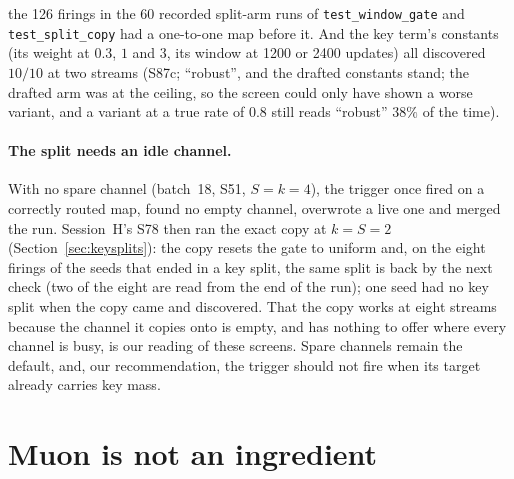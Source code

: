 \documentclass[11pt]{article}
\begin{document}
the 126 firings in the 60 recorded split-arm runs of \texttt{test\_window\_gate} and \texttt{test\_split\_copy} had a one-to-one map before it. And the key term's constants (its weight at $0.3$, $1$ and $3$, its window at 1200 or 2400 updates) all discovered $10/10$ at two streams (S87c; ``robust'', and the drafted constants stand; the drafted arm was at the ceiling, so the screen could only have shown a worse variant, and a variant at a true rate of $0.8$ still reads ``robust'' $38\%$ of the time).

\paragraph{The split needs an idle channel.} With no spare channel (batch~18, S51, $S = k = 4$), the trigger once fired on a correctly routed map, found no empty channel, overwrote a live one and merged the run. Session~H's S78 then ran the exact copy at $k = S = 2$ (Section~\ref{sec:keysplits}): the copy resets the gate to uniform and, on the eight firings of the seeds that ended in a key split, the same split is back by the next check (two of the eight are read from the end of the run); one seed had no key split when the copy came and discovered. That the copy works at eight streams because the channel it copies onto is empty, and has nothing to offer where every channel is busy, is our reading of these screens. Spare channels remain the default, and, our recommendation, the trigger should not fire when its target already carries key mass.

\section{Muon is not an ingredient}
\label{sec:muon}
\end{document}
